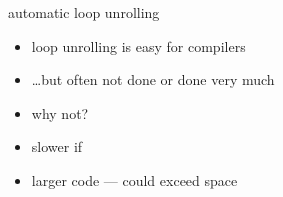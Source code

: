 \begin{frame}{automatic loop unrolling}
    \begin{itemize}
    \item loop unrolling is easy for compilers
    \item \ldots but often not done or done very much
    \item why not?
    \vspace{.5cm}
    \item<2> slower if 
    \item<2> larger code --- could exceed  space
    \end{itemize}
\end{frame}
